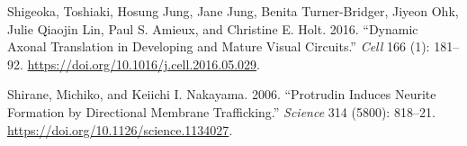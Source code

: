 \documentclass[
]{article}
\newlength{\cslhangindent}
\newlength{\cslentryspacingunit} %
\newenvironment{CSLReferences}[2] %
 {%
  \setlength{\parindent}{0pt}
  \ifodd #1
  \let\oldpar\par
  \def\par{\hangindent=\cslhangindent\oldpar}
  \fi
  \setlength{\parskip}{#2\cslentryspacingunit}
 }%
 {}
\begin{document}
\begin{CSLReferences}{1}{0}
\leavevmode{}%
Shigeoka, Toshiaki, Hosung Jung, Jane Jung, Benita Turner-Bridger,
Jiyeon Ohk, Julie Qiaojin Lin, Paul S. Amieux, and Christine E. Holt.
2016. {``Dynamic {Axonal Translation} in {Developing} and {Mature Visual
Circuits}.''} \emph{Cell} 166 (1): 181--92.
\url{https://doi.org/10.1016/j.cell.2016.05.029}.

\leavevmode{}%
Shirane, Michiko, and Keiichi I. Nakayama. 2006. {``Protrudin {Induces
Neurite Formation} by {Directional Membrane Trafficking}.''}
\emph{Science} 314 (5800): 818--21.
\url{https://doi.org/10.1126/science.1134027}.

\end{CSLReferences}
\end{document}
